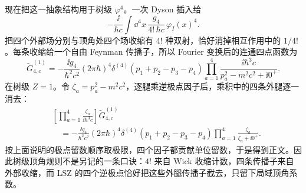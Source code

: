 \begin{derivation}[外腿极点怎样给出散射振幅]
现在把这一抽象结构用于树级 $\varphi^4$。一次 Dyson 插入给
\begin{equation*}
 -\frac{\ii}{\hbar c}
 \int\dd^4x\,
 \frac{g_4}{4!\,\hbar c}\,
 \varphi_I(x)^4.
\end{equation*}
把四个外部场分别与顶角处四个场收缩有 $4!$ 种双射，恰好消掉相互作用中的 $1/4!$。每条收缩给一个自由 Feynman 传播子，所以 Fourier 变换后的连通四点函数为
\begin{equation*}
 \widetilde G^{(1)}_{4,c}
 =-\frac{\ii g_4}{\hbar^2c^2}
 (2\pi\hbar)^4\delta^{(4)}(p_1+p_2-p_3-p_4)
 \prod_{a=1}^{4}
 \frac{\ii\hbar^3c}{p_a^2-m^2c^2+\ii0^+}.
\end{equation*}
在树级 $Z=1$。令 $\zeta_a=p_a^2-m^2c^2$，逐腿乘逆极点因子后，乘积中的四条外腿逐一消去：
\begin{align*}
 &\left[\prod_{a=1}^{4}
 \frac{\zeta_a}{\ii\hbar^3c}\right]
 \widetilde G^{(1)}_{4,c}\\
 &\quad=-\frac{\ii g_4}{\hbar^2c^2}
 (2\pi\hbar)^4\delta^{(4)}(p_1+p_2-p_3-p_4)
 \prod_{a=1}^{4}
 \frac{\zeta_a}{\zeta_a+\ii0^+}.
\end{align*}
按上面说明的极点留数顺序取极限，四个因子都贡献单位留数，于是得到正文。因此树级顶角规则不是另记的一条口诀：$4!$ 来自 Wick 收缩计数，四条传播子来自外部收缩，而 LSZ 的四个逆极点恰好把这些外腿传播子截去，只留下局域顶角系数。
\end{derivation}
